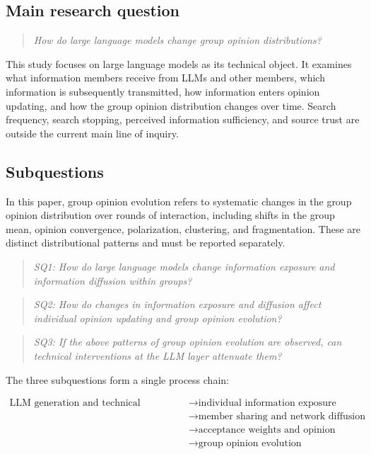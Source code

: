 \documentclass[11pt,a4paper]{article}
\begin{document}
\subsection{Main research question}

\begin{quote}\itshape
How do large language models change group opinion distributions?
\end{quote}

This study focuses on large language models as its technical object. It examines what information members receive from LLMs and other members, which information is subsequently transmitted, how information enters opinion updating, and how the group opinion distribution changes over time. Search frequency, search stopping, perceived information sufficiency, and source trust are outside the current main line of inquiry.

\subsection{Subquestions}

In this paper, group opinion evolution refers to systematic changes in the group opinion distribution over rounds of interaction, including shifts in the group mean, opinion convergence, polarization, clustering, and fragmentation. These are distinct distributional patterns and must be reported separately.

\begin{quote}\itshape
SQ1: How do large language models change information exposure and information diffusion within groups?
\end{quote}

\begin{quote}\itshape
SQ2: How do changes in information exposure and diffusion affect individual opinion updating and group opinion evolution?
\end{quote}

\begin{quote}\itshape
SQ3: If the above patterns of group opinion evolution are observed, can technical interventions at the LLM layer attenuate them?
\end{quote}

The three subquestions form a single process chain:

\begin{equation*}
\begin{aligned}\text{LLM generation and technical configuration} &\rightarrow \text{individual information exposure} \\
&\rightarrow \text{member sharing and network diffusion} \\
&\rightarrow \text{acceptance weights and opinion updating} \\
&\rightarrow \text{group opinion evolution}\end{aligned}
\end{equation*}
\end{document}
